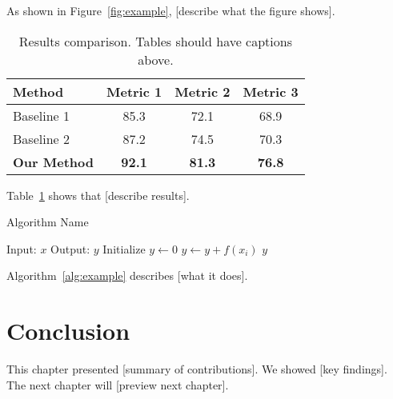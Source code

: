 As shown in Figure~\ref{fig:example}, [describe what the figure shows].

\begin{table}[htbp]
    \centering
    \caption{Results comparison. Tables should have captions above.}
    \label{tab:results}
    \begin{tabular}{lccc}
        \toprule
        Method & Metric 1 & Metric 2 & Metric 3 \\
        \midrule
        Baseline 1 & 85.3 & 72.1 & 68.9 \\
        Baseline 2 & 87.2 & 74.5 & 70.3 \\
        \textbf{Our Method} & \textbf{92.1} & \textbf{81.3} & \textbf{76.8} \\
        \bottomrule
    \end{tabular}
\end{table}

Table~\ref{tab:results} shows that [describe results].

\begin{algorithm}
    \caption{Algorithm Name}
    \label{alg:example}
    \begin{algorithmic}[1]
        \REQUIRE Input: $x$
        \ENSURE Output: $y$
        \STATE Initialize $y \leftarrow 0$
            \STATE $y \leftarrow y + f(x_i)$
        \ENDFOR
        \RETURN $y$
    \end{algorithmic}
\end{algorithm}

Algorithm~\ref{alg:example} describes [what it does].

\section{Conclusion}
\label{sec:conclusion}

This chapter presented [summary of contributions]. We showed [key findings]. The next chapter will [preview next chapter].
